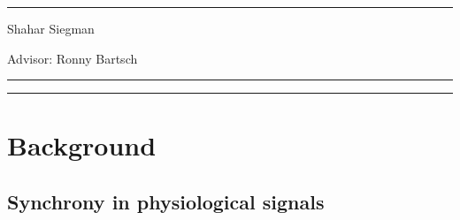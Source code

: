 \documentclass[a4paper, 11pt]{report}      %
\begin{document}
\begin{titlepage}
	\vspace{0.01\textheight} %
	\rule{0.3\textwidth}{0.4pt} %
	
	\vspace{10pt} %
	
	
	{\Large Shahar Siegman} %
	\vspace{0.05\textheight} %

	{\Large Advisor: Ronny Bartsch} %
	
	
	

	\vfill %
	
	
	\rule{\textwidth}{0.4pt} %
	
	\vspace{2pt}\vspace{-\baselineskip} %
	
	\rule{\textwidth}{1pt} %
	
\end{titlepage}



{\renewcommand{\baselinestretch}{1.3}\selectfont
\tableofcontents
}

\pagebreak

\section{Background}
\subsection{Synchrony in physiological signals}
\end{document}
